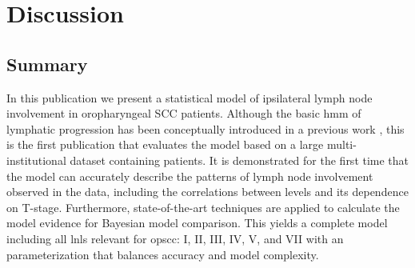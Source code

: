 \documentclass[twocolumn]{aastex631}
\begin{document}
\section{Discussion}
\label{sec:discussion}
\subsection{Summary} 
In this publication we present a statistical model of ipsilateral lymph node involvement in oropharyngeal SCC patients. Although the basic \gls{hmm} of lymphatic progression has been conceptually introduced in a previous work \cite{ludwig_hidden_2021}, this is the first publication that evaluates the model based on a large multi-institutional dataset containing  patients. It is demonstrated for the first time that the model can accurately describe the patterns of lymph node involvement observed in the data, including the correlations between levels and its dependence on T-stage. Furthermore, state-of-the-art techniques are applied to calculate the model evidence for Bayesian model comparison. This yields a complete model including all \glspl{lnl} relevant for \gls{opscc}: I, II, III, IV, V, and VII with an parameterization that balances accuracy and model complexity. 
\end{document}
